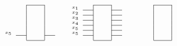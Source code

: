 \documentclass[envcountsame]{llncs}
\begin{document}
\begin{wrapfigure}{r}{80mm}\vspace{-10mm}
\[
\begin{array}{cccc}
\tiny    \begin{array}{ll|l|l}
      \cline{3-3}
          & ~ &\hspace{4mm} & ~\\
          & ~ &\hspace{4mm} & ~\\
          & ~ &\hspace{4mm} & ~\\
          & ~ & & \\
          & ~ & & \\
      x_5 & ~ & & \\
        \cline{2-2} \cline{4-4}
          & & &\\
      \cline{3-3}
    \end{array}
~~& \tiny    \begin{array}{ll|l|l}
        \cline{3-3}
     x_1     & ~ &\hspace{4mm} & ~\\
         \cline{2-2} \cline{4-4}
     x_2     & ~ &\hspace{4mm} & ~\\
         \cline{2-2} \cline{4-4}
     x_3     & ~ &\hspace{4mm} & ~\\
         \cline{2-2} \cline{4-4}
      x_4 & ~ & & \\
        \cline{2-2} \cline{4-4}
      x_5 & ~ & & \\
        \cline{2-2} \cline{4-4}
      x_5 & ~ & & \\
        \cline{2-2} \cline{4-4}
          & & &\\
      \cline{3-3}
    \end{array}
~~& \tiny    \begin{array}{ll|l|l}
      \cline{3-3}
          & ~ &\hspace{4mm} & ~\\
          & ~ &\hspace{4mm} & ~\\
          & ~ &\hspace{4mm} & ~\\
          & ~ & & \\
          & ~ & & \\
          & ~ & & \\
          & & &\\
      \cline{3-3}

\end{array}
\end{array}\]
\end{wrapfigure}
\end{document}

